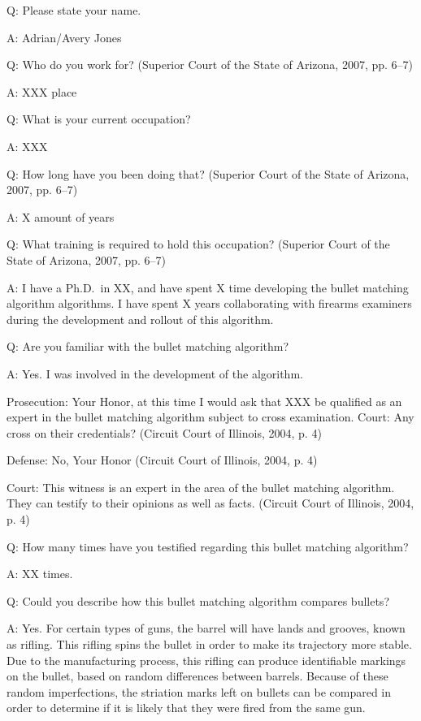 \documentclass[print]{nuthesis}
\begin{document}
Q: Please state your name.

A: Adrian/Avery Jones

Q: Who do you work for? (Superior Court of the State of Arizona, 2007, pp. 6--7)

A: XXX place

Q: What is your current occupation?

A: XXX

Q: How long have you been doing that? (Superior Court of the State of Arizona, 2007, pp. 6--7)

A: X amount of years

Q: What training is required to hold this occupation? (Superior Court of the State of Arizona, 2007, pp. 6--7)

A: I have a Ph.D.~in XX, and have spent X time developing the bullet matching algorithm algorithms.
I have spent X years collaborating with firearms examiners during the development and rollout of this algorithm.

Q: Are you familiar with the bullet matching algorithm?

A: Yes. I was involved in the development of the algorithm.

Prosecution: Your Honor, at this time I would ask that XXX be qualified as an expert in the bullet matching algorithm subject to cross examination.
Court: Any cross on their credentials? (Circuit Court of Illinois, 2004, p. 4)

Defense: No, Your Honor (Circuit Court of Illinois, 2004, p. 4)

Court: This witness is an expert in the area of the bullet matching algorithm. They can testify to their opinions as well as facts. (Circuit Court of Illinois, 2004, p. 4)

Q: How many times have you testified regarding this bullet matching algorithm?

A: XX times.

Q: Could you describe how this bullet matching algorithm compares bullets?

A: Yes. For certain types of guns, the barrel will have lands and grooves, known as rifling.
This rifling spins the bullet in order to make its trajectory more stable. Due to the manufacturing process, this rifling can produce identifiable markings on the bullet, based on random differences between barrels.
Because of these random imperfections, the striation marks left on bullets can be compared in order to determine if it is likely that they were fired from the same gun.
\end{document}
